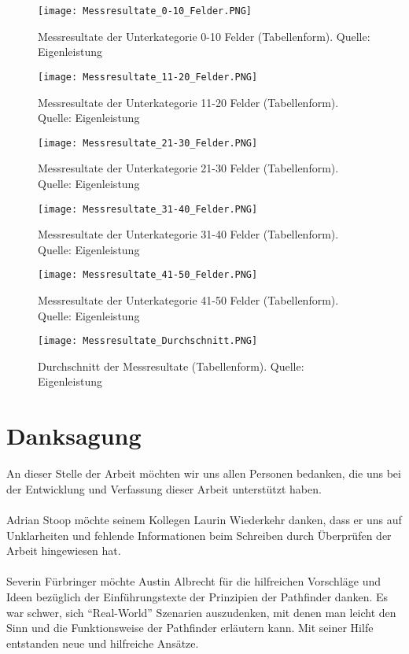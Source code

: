 \begin{figure}[H]
  \centering
  \texttt{[image: Messresultate\_0-10\_Felder.PNG]}
  \caption[Messresultate der Unterkategorie 0-10 Felder (Tabellenform).]{Messresultate der Unterkategorie 0-10 Felder (Tabellenform). Quelle: Eigenleistung}
\end{figure}
\begin{figure}[H]
  \centering
  \texttt{[image: Messresultate\_11-20\_Felder.PNG]}
  \caption[Messresultate der Unterkategorie 11-20 Felder (Tabellenform).]{Messresultate der Unterkategorie 11-20 Felder (Tabellenform). Quelle: Eigenleistung}
\end{figure}
\begin{figure}[H]
  \centering
  \texttt{[image: Messresultate\_21-30\_Felder.PNG]}
  \caption[Messresultate der Unterkategorie 21-30 Felder (Tabellenform).]{Messresultate der Unterkategorie 21-30 Felder (Tabellenform). Quelle: Eigenleistung}
\end{figure}
\begin{figure}[H]
  \centering
  \texttt{[image: Messresultate\_31-40\_Felder.PNG]}
  \caption[Messresultate der Unterkategorie 31-40 Felder (Tabellenform).]{Messresultate der Unterkategorie 31-40 Felder (Tabellenform). Quelle: Eigenleistung}
\end{figure}
\begin{figure}[H]
  \centering
  \texttt{[image: Messresultate\_41-50\_Felder.PNG]}
  \caption[Messresultate der Unterkategorie 41-50 Felder (Tabellenform).]{Messresultate der Unterkategorie 41-50 Felder (Tabellenform). Quelle: Eigenleistung}
\end{figure}
\begin{figure}[H]
  \centering
  \texttt{[image: Messresultate\_Durchschnitt.PNG]}
  \caption[Durchschnitt der Messresultate (Tabellenform).]{Durchschnitt der Messresultate (Tabellenform). Quelle: Eigenleistung}
\end{figure}

\section{Danksagung}
An dieser Stelle der Arbeit möchten wir uns allen Personen bedanken, die uns bei der Entwicklung und Verfassung dieser Arbeit unterstützt haben.
\\\\
Adrian Stoop möchte seinem Kollegen Laurin Wiederkehr danken, dass er uns auf Unklarheiten und fehlende Informationen beim Schreiben durch Überprüfen der Arbeit hingewiesen hat.
\\\\
Severin Fürbringer möchte Austin Albrecht für die hilfreichen Vorschläge und Ideen bezüglich der Einführungstexte der Prinzipien der Pathfinder danken. Es war schwer, sich ``Real-World'' Szenarien auszudenken, mit denen man leicht den Sinn und die Funktionsweise der Pathfinder erläutern kann. Mit seiner Hilfe entstanden neue und hilfreiche Ansätze.


